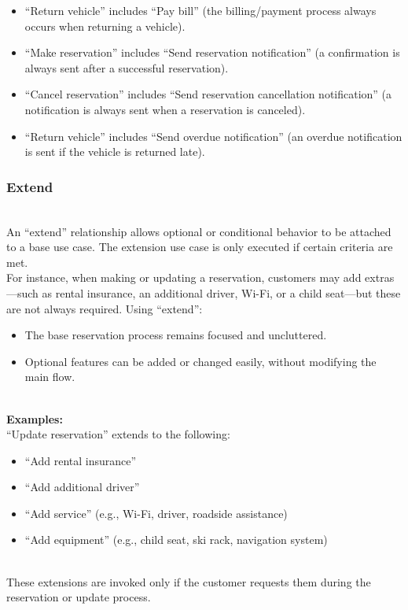 \begin{itemize}
\item
\protect{}\label{aKauXIpkDe4qYPHoZXA5y}
``Return vehicle'' includes ``Pay bill'' (the billing/payment process always occurs when returning a vehicle).
\item
\protect{}\label{5qVThbCA7l9xrTDyGbzMF}
``Make reservation'' includes ``Send reservation notification'' (a confirmation is always sent after a successful reservation).
\item
\protect{}\label{_-qINTui3oi8iKfJLQ_0X}
``Cancel reservation'' includes ``Send reservation cancellation notification'' (a notification is always sent when a reservation is canceled).
\item
\protect{}\label{xl7gRCG7gWsyIGfIySe7i}
``Return vehicle'' includes ``Send overdue notification'' (an overdue notification is sent if the vehicle is returned late).
\end{itemize}

\subsubsection{Extend}\label{gonygcR5BZIYTZCqbL6aU}
\\
An ``extend'' relationship allows optional or conditional behavior to be attached to a base use case. The extension use case is only executed if certain criteria are met.
\\
For instance, when making or updating a reservation, customers may add extras---such as rental insurance, an additional driver, Wi-Fi, or a child seat---but these are not always required. Using ``extend'':

\begin{itemize}
\item
\protect{}\label{BQTIASluUBrtKfSyyEapu}
The base reservation process remains focused and uncluttered.
\item
\protect{}\label{OSnO3y3YO-D4xph-8yq2_}
Optional features can be added or changed easily, without modifying the main flow.
\end{itemize}
\\
\textbf{Examples:}
\\
``Update reservation'' extends to the following:

\begin{itemize}
\item
\protect{}\label{e1dAZcXXJrAZiq7gihBta}
``Add rental insurance''
\item
\protect{}\label{En5QN6bscAnbyvBPxPPmo}
``Add additional driver''
\item
\protect{}\label{ccZu6k3Ph3zj2l2iYo5C8}
``Add service'' (e.g., Wi-Fi, driver, roadside assistance)
\item
\protect{}\label{hlFNsOHkrWW745i10imTR}
``Add equipment'' (e.g., child seat, ski rack, navigation system)
\end{itemize}
\\
These extensions are invoked only if the customer requests them during the reservation or update process.

